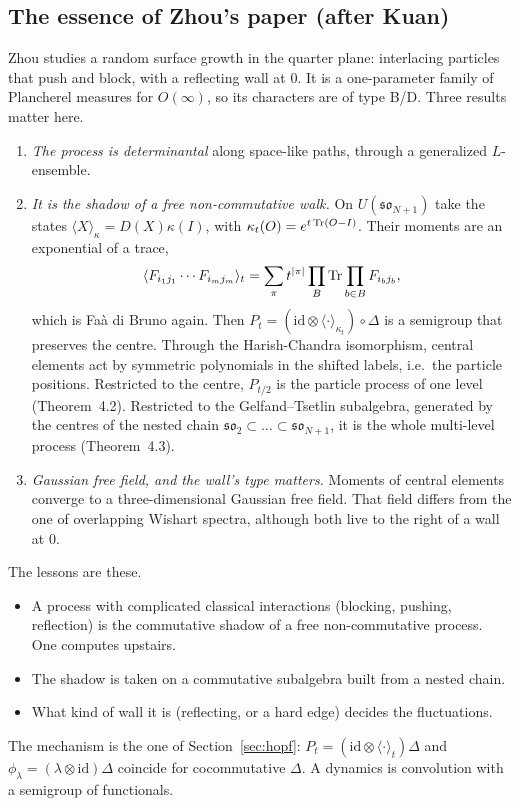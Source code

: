 \label{sec:lift}
\subsection{The essence of Zhou's paper (after Kuan)}
Zhou studies a random surface growth in the quarter plane: interlacing particles that push and block, with a reflecting wall at $0$. It
is a one-parameter family of Plancherel measures for $O(\infty)$, so its characters are of type B/D. Three results matter here.
\begin{enumerate}[leftmargin=*]
\item \emph{The process is determinantal} along space-like paths, through a generalized $L$-ensemble.
\item \emph{It is the shadow of a free non-commutative walk.} On $U(\mathfrak{so}_{N+1})$ take the states $\langle X\rangle_\kappa=D(X)\kappa(I)$, with
$\kappa_t(O)=e^{t\operatorname{Tr}(O-I)}$. Their moments are an exponential of a trace,
\[\langle F_{i_1j_1}\cdots F_{i_mj_m}\rangle_t=\sum_\pi t^{|\pi|}\prod_B\operatorname{Tr}\prod_{b\in B}F_{i_bj_b},\]
which is Faà di Bruno again. Then
$P_t=(\mathrm{id}\otimes\langle\cdot\rangle_{\kappa_t})\circ\Delta$ is a semigroup that preserves the centre. Through the Harish-Chandra isomorphism, central
elements act by symmetric polynomials in the shifted labels, i.e.\ the particle positions. Restricted to the centre, $P_{t/2}$ is the
particle process of one level (Theorem~4.2). Restricted to the Gelfand--Tsetlin subalgebra, generated by the centres of the nested chain
$\mathfrak{so}_2\subset\dots\subset\mathfrak{so}_{N+1}$, it is the whole multi-level process (Theorem~4.3).
\item \emph{Gaussian free field, and the wall's type matters.} Moments of central elements converge to a three-dimensional Gaussian free
field. That field differs from the one of overlapping Wishart spectra, although both live to the right of a wall at $0$.
\end{enumerate}
The lessons are these.
\begin{itemize}[leftmargin=*]
\item[(L1)] A process with complicated classical interactions (blocking, pushing, reflection) is the commutative shadow of a free
non-commutative process. One computes upstairs.
\item[(L2)] The shadow is taken on a commutative subalgebra built from a nested chain.
\item[(L3)] What kind of wall it is (reflecting, or a hard edge) decides the fluctuations.
\end{itemize}
The mechanism is the one of Section~\ref{sec:hopf}: $P_t=(\mathrm{id}\otimes\langle\cdot\rangle_t)\Delta$ and $\phi_\lambda=(\lambda\otimes\mathrm{id})\Delta$ coincide for
cocommutative $\Delta$. A dynamics is convolution with a semigroup of functionals.

